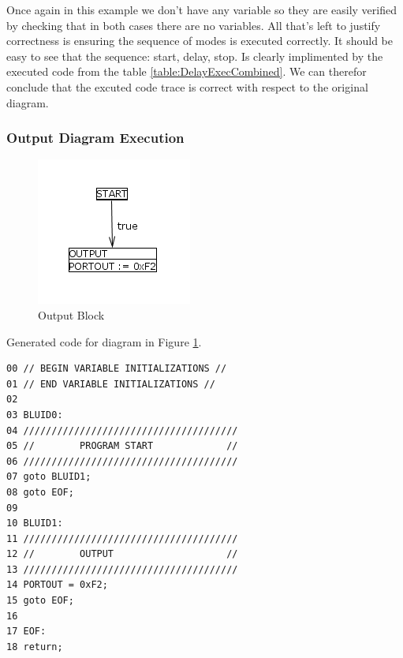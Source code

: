 Once again in this example we don't have any variable so they are easily verified by checking that in both cases
there are no variables. All that's left to justify correctness is ensuring the sequence of modes is executed correctly.
It should be easy to see that the sequence: start, delay, stop. Is clearly implimented by the executed code from the table
\ref{table:DelayExecCombined}. We can therefor conclude that the excuted code trace is correct with respect to the original
diagram.

\subsubsection{Output Diagram Execution}

\begin{figure}[htb]
	\centering
	\includegraphics[width=\imgmedsmall]{./images/correctness_ex_output.png}
	\caption{Output Block}
	\label{fig:correctness_ex_output}
\end{figure}

Generated  code for diagram in Figure \ref{fig:correctness_ex_output}.
\begin{lstlisting}[frame=single]
00 // BEGIN VARIABLE INITIALIZATIONS //
01 // END VARIABLE INITIALIZATIONS //
02 
03 BLUID0:
04 //////////////////////////////////////
05 //        PROGRAM START             //
06 //////////////////////////////////////
07 goto BLUID1;
08 goto EOF;
09 
10 BLUID1:
11 //////////////////////////////////////
12 //        OUTPUT                    //
13 //////////////////////////////////////
14 PORTOUT = 0xF2;
15 goto EOF;
16 
17 EOF:
18 return;
\end{lstlisting}

